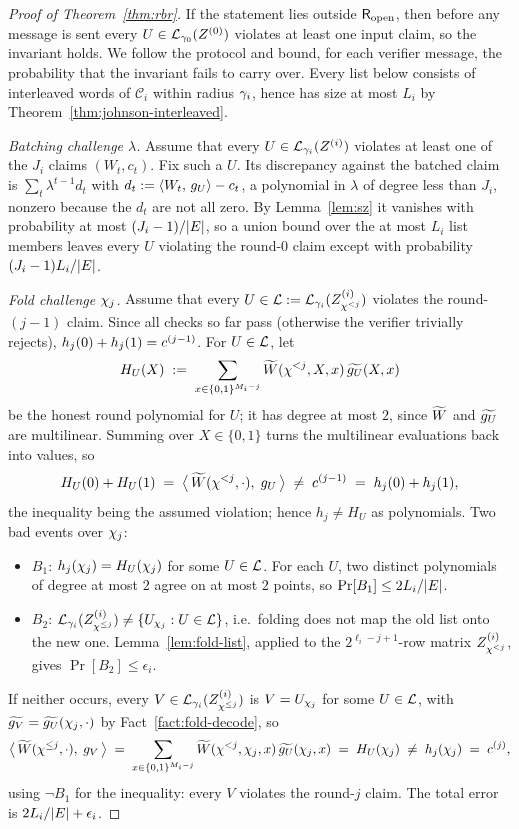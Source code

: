 \begin{proof}[Proof of Theorem~\ref{thm:rbr}]
If the statement lies outside $\mathsf{R}_{\mathrm{open}}$, then before any message is sent every $U \in \mathcal{L}_{\gamma_0}(Z^{(0)})$ violates at least one input claim, so the invariant holds. We follow the protocol and bound, for each verifier message, the probability that the invariant fails to carry over. Every list below consists of interleaved words of $\mathcal{C}_i$ within radius $\gamma_i$, hence has size at most $L_i$ by Theorem~\ref{thm:johnson-interleaved}.

\medskip\noindent\emph{Batching challenge $\lambda$.}
Assume that every $U \in \mathcal{L}_{\gamma_i}(Z^{(i)})$ violates at least one of the $J_i$ claims $(W_t, c_t)$. Fix such a $U$. Its discrepancy against the batched claim is $\sum_{t} \lambda^{t - 1} d_t$ with $d_t := \langle W_t,\, g_U \rangle - c_t$, a polynomial in $\lambda$ of degree less than $J_i$, nonzero because the $d_t$ are not all zero. By Lemma~\ref{lem:sz} it vanishes with probability at most $(J_i - 1)/|E|$, so a union bound over the at most $L_i$ list members leaves every $U$ violating the round-$0$ claim except with probability $(J_i - 1) L_i / |E|$.

\medskip\noindent\emph{Fold challenge $\chi_j$.}
Assume that every $U \in \mathcal{L} := \mathcal{L}_{\gamma_i}(Z^{(i)}_{\chi^{<j}})$ violates the round-$(j{-}1)$ claim. Since all checks so far pass (otherwise the verifier trivially rejects), $h_j(0) + h_j(1) = c^{(j-1)}$. For $U \in \mathcal{L}$, let
\[
H_U(X) \;:=\; \sum_{x \in \{0,1\}^{M_i - j}} \widetilde{W}(\chi^{<j}, X, x)\, \widetilde{g_U}(X, x)
\]
be the honest round polynomial for $U$; it has degree at most $2$, since $\widetilde{W}$ and $\widetilde{g_U}$ are multilinear. Summing over $X \in \{0, 1\}$ turns the multilinear evaluations back into values, so
\[
H_U(0) + H_U(1) \;=\; \bigl\langle\, \widetilde{W}(\chi^{<j}, \cdot),\; g_U \,\bigr\rangle \;\neq\; c^{(j-1)} \;=\; h_j(0) + h_j(1),
\]
the inequality being the assumed violation; hence $h_j \neq H_U$ as polynomials. Two bad events over $\chi_j$:
\begin{itemize}[itemsep=1pt]
\item $B_1$: $h_j(\chi_j) = H_U(\chi_j)$ for some $U \in \mathcal{L}$. For each $U$, two distinct polynomials of degree at most $2$ agree on at most $2$ points, so $\Pr[B_1] \le 2 L_i / |E|$.
\item $B_2$: $\mathcal{L}_{\gamma_i}(Z^{(i)}_{\chi^{\le j}}) \neq \{ U_{\chi_j} : U \in \mathcal{L} \}$, i.e.\ folding does not map the old list onto the new one. Lemma~\ref{lem:fold-list}, applied to the $2^{\ell_i - j + 1}$-row matrix $Z^{(i)}_{\chi^{<j}}$, gives $\Pr[B_2] \le \epsilon_i$.
\end{itemize}
If neither occurs, every $V \in \mathcal{L}_{\gamma_i}(Z^{(i)}_{\chi^{\le j}})$ is $V = U_{\chi_j}$ for some $U \in \mathcal{L}$, with $\widetilde{g_V} = \widetilde{g_U}(\chi_j, \cdot)$ by Fact~\ref{fact:fold-decode}, so
\[
\bigl\langle\, \widetilde{W}(\chi^{\le j}, \cdot),\; g_V \,\bigr\rangle
\;=\; \sum_{x \in \{0,1\}^{M_i - j}} \widetilde{W}(\chi^{<j}, \chi_j, x)\, \widetilde{g_U}(\chi_j, x)
\;=\; H_U(\chi_j) \;\neq\; h_j(\chi_j) \;=\; c^{(j)} ,
\]
using $\neg B_1$ for the inequality: every $V$ violates the round-$j$ claim. The total error is $2 L_i/|E| + \epsilon_i$.


\end{proof}
